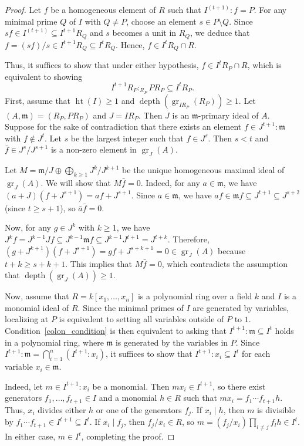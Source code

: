 \documentclass[12pt]{amsart}
\begin{document}
\begin{proof}
Let $f$ be a homogeneous element of $R$ such that $I^{(t+1)} : f = P$. For any minimal prime $Q$ of $I$ with $Q \neq P$, choose an element $s \in P \setminus Q$. Since $s f \in I^{(t+1)} \subseteq I^{t+1} R_Q$ and $s$ becomes a unit in $R_Q$, we deduce that $f = (s f)/s \in I^{t+1} R_Q \subseteq I^t R_Q$. Hence, $f \in I^t R_Q \cap R$. 

Thus, it suffices to show that under either hypothesis, $f \in I^t R_P \cap R$, which is equivalent to showing 
\begin{equation}\label{colon_condition}
    I^{t+1} R_P :_{R_P} P R_P \subseteq I^t R_P.
\end{equation}
First, assume that $\operatorname{ht}(I) \ge 1$ and $\operatorname{depth}(\operatorname{gr}_{I R_P}(R_P)) \ge 1$. Let $(A, \mathfrak{m}) = (R_P, P R_P)$ and $J = I R_P$. Then $J$ is an $\mathfrak{m}$-primary ideal of $A$. Suppose for the sake of contradiction that there exists an element $f \in J^{t+1} : \mathfrak{m}$ with $f \notin J^t$. Let $s$ be the largest integer such that $f \in J^s$. Then $s < t$ and $\bar{f} \in J^s / J^{s+1}$ is a non-zero element in $\operatorname{gr}_J(A)$. 

Let $M = \mathfrak{m}/J \oplus \bigoplus_{k \ge 1} J^k / J^{k+1}$ be the unique homogeneous maximal ideal of $\operatorname{gr}_J(A)$. We will show that $M \bar{f} = 0$. Indeed, for any $a \in \mathfrak{m}$, we have $(a + J)(f + J^{s+1}) = a f + J^{s+1}$. Since $a \in \mathfrak{m}$, we have $a f \in \mathfrak{m} f \subseteq J^{t+1} \subseteq J^{s+2}$ (since $t \ge s + 1$), so $\bar{a} \bar{f} = 0$. 

Now, for any $g \in J^k$ with $k \ge 1$, we have $J^k f = J^{k-1} J f \subseteq J^{k-1} \mathfrak{m} f \subseteq J^{k-1} J^{t+1} = J^{t+k}$. Therefore, $(g + J^{k+1})(f + J^{s+1}) = g f + J^{s+k+1} = 0 \in \operatorname{gr}_J(A)$ because $t+k \ge s+k+1$. This implies that $M \bar{f} = 0$, which contradicts the assumption that $\operatorname{depth}(\operatorname{gr}_J(A)) \ge 1$.

Now, assume that $R = k[x_1, \ldots, x_n]$ is a polynomial ring over a field $k$ and $I$ is a monomial ideal of $R$. Since the minimal primes of $I$ are generated by variables, localizing at $P$ is equivalent to setting all variables outside of $P$ to $1$. Condition~\eqref{colon_condition} is then equivalent to asking that $I^{t+1} : \mathfrak{m} \subseteq I^t$ holds in a polynomial ring, where $\mathfrak{m}$ is generated by the variables in $P$. Since $I^{t+1} : \mathfrak{m} = \bigcap_{i=1}^n (I^{t+1} : x_i)$, it suffices to show that $I^{t+1} : x_i \subseteq I^t$ for each variable $x_i \in \mathfrak{m}$. 

Indeed, let $m \in I^{t+1} : x_i$ be a monomial. Then $m x_i \in I^{t+1}$, so there exist generators $f_1, \ldots, f_{t+1} \in I$ and a monomial $h \in R$ such that $m x_i = f_1 \cdots f_{t+1} h$. Thus, $x_i$ divides either $h$ or one of the generators $f_j$. If $x_i \mid h$, then $m$ is divisible by $f_1 \cdots f_{t+1} \in I^{t+1} \subseteq I^t$. If $x_i \mid f_j$, then $f_j / x_i \in R$, so $m = (f_j / x_i) \prod_{l \neq j} f_l h \in I^t$. In either case, $m \in I^t$, completing the proof.
\end{proof}
\end{document}
